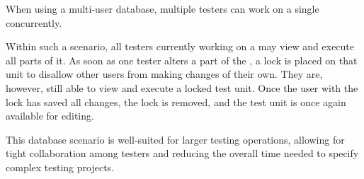

When using a multi-user database, multiple testers
 can work on a single \gdproject{} concurrently.

Within such a scenario, all testers currently working on a \gdproject{}
 may view and execute all parts of it.
As soon as one tester alters  a part of the \gdproject{},
 a lock is placed on that unit to disallow other users from making
 changes of their own. They are, however, still able to view and execute
 a locked test unit.
Once the user with the lock has saved all changes, the lock is removed, and the test unit is once again available for editing.

This database scenario is well-suited for larger testing operations, 
allowing for tight collaboration among testers and
 reducing the overall time needed to specify complex testing projects.


